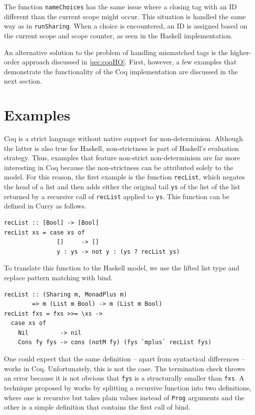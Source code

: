 \documentclass[a4paper, 11pt, fleqn, twoside]{scrreprt}
\newcommand{\hinl}[1]{\texttt{#1}}
\newcommand{\cinl}[1]{\texttt{#1}}
\begin{document}
The function \cinl{nameChoices} has the same issue where a closing tag with an ID different than the current scope might occur.
This situation is handled the same way as in \cinl{runSharing}.
When a choice is encountered, an ID is assigned based on the current scope and scope counter, as seen in the Haskell implementation.

An alternative solution to the problem of handling mismatched tags is the higher-order approach discussed in \autoref{sec:coqHO}.
First, however, a few examples that demonstrate the functionality of the Coq implementation are discussed in the next section.

\section{Examples}
Coq is a strict language without native support for non-determinism.
Although the latter is also true for Haskell, non-strictness is part of Haskell's evaluation strategy.
Thus, examples that feature non-strict non-determinism are far more interesting in Coq because the non-strictness can be attributed solely to the model.
For this reason, the first example is the function \hinl{recList}, which negates the head of a list and then adds either the original tail \hinl{ys} of the list of the list returned by a recursive call of \hinl{recList} applied to \hinl{ys}.
This function can be defined in Curry as follows. 

\begin{verbatim}
recList :: [Bool] -> [Bool]
recList xs = case xs of
               []     -> []
               y : ys -> not y : (ys ? recList ys)
\end{verbatim}

To translate this function to the Haskell model, we use the lifted list type and replace pattern matching with bind.

\begin{verbatim}
recList :: (Sharing m, MonadPlus m) 
        => m (List m Bool) -> m (List m Bool)
recList fxs = fxs >>= \xs ->
  case xs of
    Nil         -> nil
    Cons fy fys -> cons (notM fy) (fys `mplus` recList fys)
\end{verbatim}

One could expect that the same definition -- apart from syntactical differences -- works in Coq.
Unfortunately, this is not the case.
The termination check throws an error because it is not obvious that \hinl{fys} is a structurally smaller than \hinl{fxs}.
A technique proposed by \citet{dylus2019oneMonad} works by splitting a recursive function into two definitions, where one is recursive but takes plain values instead of \cinl{Prog} arguments and the other is a simple definition that contains the first call of bind.
\end{document}
